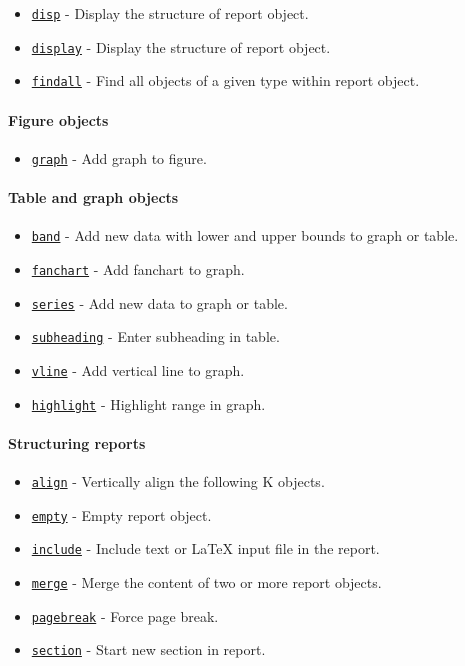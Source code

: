  \begin{itemize}
 \item
   \href{report/disp}{\texttt{disp}} - Display the structure of report
   object.
 \item
   \href{report/display}{\texttt{display}} - Display the structure of
   report object.
 \item
   \href{report/findall}{\texttt{findall}} - Find all objects of a given
   type within report object.
 \end{itemize}
 
 \paragraph{Figure objects}
 
 \begin{itemize}
 \item
   \href{report/graph}{\texttt{graph}} - Add graph to figure.
 \end{itemize}
 
 \paragraph{Table and graph objects}
 
 \begin{itemize}
 \item
   \href{report/band}{\texttt{band}} - Add new data with lower and upper
   bounds to graph or table.
 \item
   \href{report/fanchart}{\texttt{fanchart}} - Add fanchart to graph.
 \item
   \href{report/series}{\texttt{series}} - Add new data to graph or
   table.
 \item
   \href{report/subheading}{\texttt{subheading}} - Enter subheading in
   table.
 \item
   \href{report/vline}{\texttt{vline}} - Add vertical line to graph.
 \item
   \href{report/highlight}{\texttt{highlight}} - Highlight range in
   graph.
 \end{itemize}
 
 \paragraph{Structuring reports}
 
 \begin{itemize}
 \item
   \href{report/align}{\texttt{align}} - Vertically align the following K
   objects.
 \item
   \href{report/empty}{\texttt{empty}} - Empty report object.
 \item
   \href{report/include}{\texttt{include}} - Include text or LaTeX input
   file in the report.
 \item
   \href{report/merge}{\texttt{merge}} - Merge the content of two or more
   report objects.
 \item
   \href{report/pagebreak}{\texttt{pagebreak}} - Force page break.
 \item
   \href{report/section}{\texttt{section}} - Start new section in report.
 \end{itemize}
 
